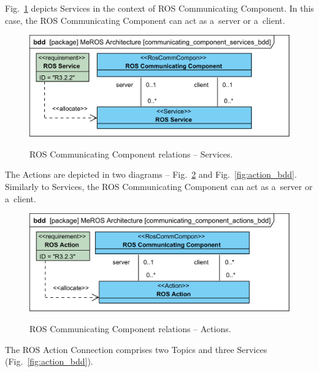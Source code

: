 \documentclass[11pt,oneside,a4paper]{report}
\begin{document}
	\pagebreak
	
	Fig.~\ref{fig:communication_blocks_services_bdd} depicts Services in the context of ROS Communicating Component. In this case, the ROS Communicating Component can act as a~server or a~client.	
	
		
	\begin{figure}[H]
		\centering
		\begin{center}
			{\includegraphics[scale=1.0]{diagrams/communicating_component_services_bdd.png}}
		\end{center}
		\caption{ROS Communicating Component relations -- Services.} 
		\label{fig:communication_blocks_services_bdd}
	\end{figure}
		
	The Actions are depicted in two diagrams -- Fig.~\ref{fig:communicating_component_actions_bdd} and Fig.~\ref{fig:action_bdd}. Similarly to Services, the ROS Communicating Component can act as a~server or a~client.	 
	
	
	\begin{figure}[H]
		\centering
		\begin{center}
			{\includegraphics[scale=1.0]{diagrams/communicating_component_actions_bdd.png}}
		\end{center}
		\caption{ROS Communicating Component relations -- Actions.} 
		\label{fig:communicating_component_actions_bdd}
	\end{figure}
	
	The ROS Action Connection comprises two Topics and three Services (Fig.~\ref{fig:action_bdd}).
	
\end{document}
